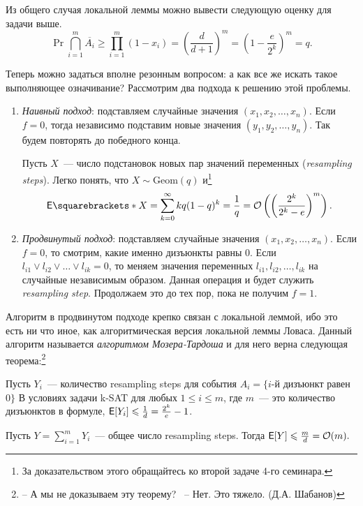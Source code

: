 Из общего случая локальной леммы можно вывести следующую оценку для задачи выше. 
\[\Pr{\bigcap\limits_{i = 1}^{m}\overline{A_i}} \geq \prod\limits_{i = 1}^{m}(1 - x_i) = \left(\frac{d}{d+1}\right)^{m} = \left(1 - \frac{e}{2^k} \right)^{m} = q.\]

Теперь можно задаться вполне резонным вопросом: а как все же искать такое выполняющее означивание? Рассмотрим два подхода к решению этой проблемы.
\begin{enumerate}
    \item \emph{Наивный подход}: подставляем случайные значения \((x_1, x_2, \dots, x_n )\). Если \(f = 0\), тогда независимо подставим новые значения \((y_1, y_2, \dots, y_n)\). Так будем повторять до победного конца.
    
    Пусть \(X\)~--- число подстановок новых пар значений переменных (\emph{resampling steps}). Легко понять, что \(X \sim \mathrm{Geom}(q)\) и\footnote{За доказательством этого обращайтесь ко второй задаче 4-го семинара.}
    \[\E{X} = \sum_{k = 0}^{\infty} kq(1 - q)^{k} = \frac{1}{q} = \mathcal{O}\left(\left(\frac{2^k}{2^k - e}\right)^{m}\right).\]
    
    \item \emph{Продвинутый подход}: подставляем случайные значения \((x_1, x_2, \dots, x_n )\). Если \(f = 0\), то смотрим, какие именно дизъюнкты равны 0. Если \(l_{i1} \lor l_{i2} \lor \dots \lor l_{ik} = 0\), то меняем значения переменных \(l_{i1}, l_{i2}, \dots, l_{ik}\) на случайные независимым образом. Данная операция и будет служить \emph{resampling step}. Продолжаем это до тех пор, пока не получим \(f = 1\).
\end{enumerate}

Алгоритм в продвинутом подходе крепко связан с локальной леммой, ибо это есть ни что иное, как алгоритмическая версия локальной леммы Ловаса. Данный алгоритм называется \emph{алгоритмом Мозера-Тардоша} и для него верна следующая теорема:\footnote{-- А мы не доказываем эту теорему? \ -- Нет. Это тяжело. (Д.А. Шабанов)}

\begin{theorem}
    Пусть \(Y_i\)~--- количество resampling steps для события \(A_i  = \{i\)-й дизъюнкт равен \(0\}\) В условиях задачи \textsf{k-SAT} для любых \(1 \leq  i \leq m \), где \(m\)~--- это количество дизъюнктов в формуле, \(\E[Y_i] \leq \frac{1}{d} = \frac{2^k}{e} - 1\).
    
    Пусть \(Y = \sum\limits_{i = 1}^{m}Y_i \)~--- общее число resampling steps. Тогда \(\E[Y] \leq \frac{m}{d} = \mathcal{O}(m). \)
\end{theorem}

